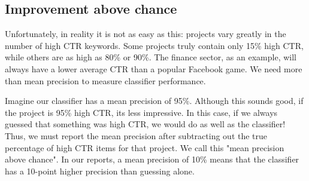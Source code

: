 \subsection*{Improvement above chance}
Unfortunately, in reality it is not as easy as this: projects vary greatly in the number of high CTR keywords. Some projects truly contain only 15\% high CTR,
 while others are as high as 80\% or 90\%. The finance sector, as an example, will always have a lower average CTR than a popular Facebook game.  We need more than mean precision to measure classifier performance.

Imagine our classifier has a mean precision of 95\%. Although this sounds good, if the project is 95\% high CTR, it\textsc{}s less impressive. In this case, if we always guessed that something was high CTR, we would do as well as the classifier! Thus, we must report the mean precision after subtracting out the true percentage of high CTR items for that project. We call this "mean precision above chance". In our reports, a mean precision of 10\% means that the classifier has a 10-point higher precision than guessing alone.



